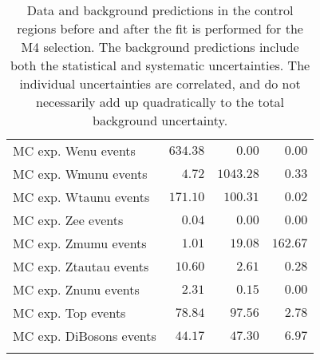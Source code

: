 \begin{table}
\begin{center}
{\begin{tabular*}{\textwidth}{@{\extracolsep{\fill}}lrrr}
        MC exp. Wenu events         & $634.38$          & $0.00$          & $0.00$              \\
        MC exp. Wmunu events         & $4.72$          & $1043.28$          & $0.33$              \\
        MC exp. Wtaunu events         & $171.10$          & $100.31$          & $0.02$              \\
        MC exp. Zee events         & $0.04$          & $0.00$          & $0.00$              \\
        MC exp. Zmumu events         & $1.01$          & $19.08$          & $162.67$              \\
        MC exp. Ztautau events         & $10.60$          & $2.61$          & $0.28$              \\
        MC exp. Znunu events         & $2.31$          & $0.15$          & $0.00$              \\
        MC exp. Top events         & $78.84$          & $97.56$          & $2.78$              \\
        MC exp. DiBosons events         & $44.17$          & $47.30$          & $6.97$              \\
\noalign{\smallskip}\hline\noalign{\smallskip}
\end{tabular*}
}
\end{center}
\caption{Data and background predictions in the control regions before and after the fit is performed for the M4 selection.
  The background predictions include both the statistical and systematic uncertainties.
    The individual uncertainties are correlated, and do not necessarily add up
    quadratically to the total background uncertainty.
}
\label{tab:ControlRegion_M4}
\end{table}
%
